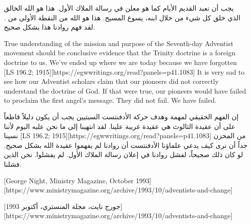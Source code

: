 يجب أن نعبد القديم الأيام كما هو معلن في رسالة الملاك الأول. هذا هو الله الخالق الذي خلق كل شيء من خلال ابنه، يسوع المسيح. هذا هو الله من النقطة الأولى من . لقد فهم روادنا هذا بشكل صحيح.


True understanding of the mission and purpose of the Seventh-day Adventist movement should be conclusive evidence that the Trinity doctrine is a foreign doctrine to us. We’ve ended up where we are today because we have forgotten [LS 196.2; 1915][https://egwwritings.org/read?panels=p41.1083] It is very sad to see how our Adventist scholars claim that our pioneers did not correctly understand the doctrine of God. If that were true, our pioneers would have failed to proclaim the first angel's message. They did not fail. We have failed.


إن الفهم الحقيقي لمهمة وهدف حركة الأدفنتست السبتيين يجب أن يكون دليلاً قاطعاً على أن عقيدة الثالوث هي عقيدة غريبة علينا. لقد انتهينا إلى ما نحن عليه اليوم لأننا نسينا [LS 196.2; 1915][https://egwwritings.org/read?panels=p41.1083] من المحزن جداً أن نرى كيف يدعي علماؤنا الأدفنتست أن روادنا لم يفهموا عقيدة الله بشكل صحيح. لو كان ذلك صحيحاً، لفشل روادنا في إعلان رسالة الملاك الأول. لم يفشلوا. نحن الذين فشلنا.


[George Night, Ministry Magazine, October 1993][https://www.ministrymagazine.org/archive/1993/10/adventists-and-change]


[جورج نايت، مجلة المنستري، أكتوبر 1993][https://www.ministrymagazine.org/archive/1993/10/adventists-and-change]


